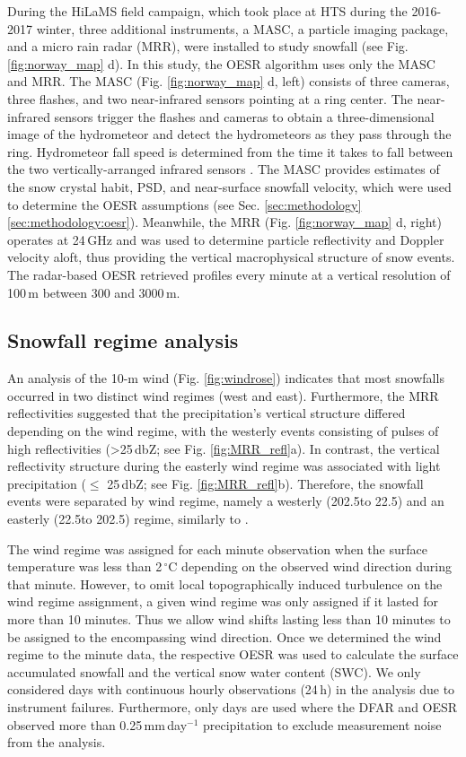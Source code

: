 \documentclass{ametsocV5}
\begin{document}
		During the HiLaMS field campaign, which took place at HTS during the 2016-2017 winter, three additional instruments, a MASC, a particle imaging package, and a micro rain radar (MRR), were installed to study snowfall (see Fig. \ref{fig:norway_map} d). In this study, the OESR algorithm uses only the MASC and MRR. The MASC (Fig. \ref{fig:norway_map} d, left) consists of three cameras, three flashes, and two near-infrared sensors pointing at a ring center. The near-infrared sensors trigger the flashes and cameras to obtain a three-dimensional image of the hydrometeor and detect the hydrometeors as they pass through the ring. Hydrometeor fall speed is determined from the time it takes to fall between the two vertically-arranged infrared sensors \citep{garrett_fall_2012}. The MASC provides estimates of the snow crystal habit, PSD, and near-surface snowfall velocity, which were used to determine the OESR assumptions (see Sec. \ref{sec:methodology}\ref{sec:methodology:oesr}). Meanwhile, the MRR (Fig. \ref{fig:norway_map} d, right) operates at 24\,GHz and was used to determine particle reflectivity and Doppler velocity aloft, thus providing the vertical macrophysical structure of snow events. The radar-based OESR retrieved profiles every minute at a vertical resolution of 100\,m between 300 and 3000\,m. 


	\subsection{Snowfall regime analysis}\label{sec:methodology:snowfall_reg}
		An analysis of the 10-m wind (Fig. \ref{fig:windrose}) indicates that most snowfalls occurred in two distinct wind regimes (west and east). Furthermore, the MRR reflectivities suggested that the precipitation's vertical structure differed depending on the wind regime, with the westerly events consisting of pulses of high reflectivities (\textgreater 25\,dbZ; see Fig. \ref{fig:MRR_refl}a). In contrast, the vertical reflectivity structure during the easterly wind regime was associated with light precipitation ($\leq$ 25\,dbZ; see Fig. \ref{fig:MRR_refl}b). Therefore, the snowfall events were separated by wind regime, namely a westerly (202.5\textdegree to 22.5\textdegree) and an easterly (22.5\textdegree to 202.5\textdegree) regime, similarly to \citet{schirle_estimation_2019}. 

		The wind regime was assigned for each minute observation when the surface temperature was less than 2\,$^{\circ}$C depending on the observed wind direction during that minute. However, to omit local topographically induced turbulence on the wind regime assignment, a given wind regime was only assigned if it lasted for more than 10 minutes. Thus we allow wind shifts lasting less than 10 minutes to be assigned to the encompassing wind direction. Once we determined the wind regime to the minute data, the respective OESR was used to calculate the surface accumulated snowfall and the vertical snow water content (SWC). We only considered days with continuous hourly observations (24\,h) in the analysis due to instrument failures. Furthermore, only days are used where the DFAR and OESR observed more than 0.25\,mm\,day$^{-1}$ precipitation to exclude measurement noise from the analysis.	
		
\end{document}
